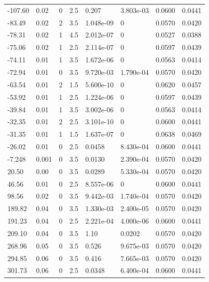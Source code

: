 \documentclass[preview]{standalone}
\begin{document}
{{\begin{tabular}{L{1.2cm}C{1.2cm} C{0.3cm}C{0.5cm} C{1.4cm}C{1.4cm} C{1.4cm}C{1.4cm}}
  -107.60  &  0.02  & 0     & 2.5 &  0.207  & 3.803e-03  & 0.0600 &  0.0441   \\ 
  -83.49  &  0.02  & 2     & 3.5 &  1.048e-09  & 0  & 0.0570 &  0.0420   \\ 
  -78.31  &  0.02  & 1     & 4.5 &  2.012e-07  & 0  & 0.0527 &  0.0388   \\ 
  -75.06  &  0.02  & 1     & 2.5 &  2.114e-07  & 0  & 0.0597 &  0.0439   \\ 
  -74.11  &  0.01  & 1     & 3.5 &  1.672e-06  & 0  & 0.0563 &  0.0414   \\ 
  -72.94  &  0.01  & 0     & 3.5 &  9.720e-03  & 1.790e-04  & 0.0570 &  0.0420   \\ 
  -63.54  &  0.01  & 2     & 1.5 &  5.600e-10  & 0  & 0.0620 &  0.0457   \\ 
  -53.92  &  0.01  & 1     & 2.5 &  1.224e-06  & 0  & 0.0597 &  0.0439   \\ 
  -39.84  &  0.01  & 1     & 3.5 &  3.002e-06  & 0  & 0.0563 &  0.0414   \\ 
  -32.35  &  0.01  & 2     & 2.5 &  3.101e-10  & 0  & 0.0600 &  0.0441   \\ 
  -31.35  &  0.01  & 1     & 1.5 &  1.637e-07  & 0  & 0.0638 &  0.0469   \\ 
  -26.02  &  0.01  & 0     & 2.5 &  0.0458  & 8.430e-04  & 0.0600 &  0.0441   \\ 
  -7.248  &  0.001  & 0     & 3.5 &  0.0130  & 2.390e-04  & 0.0570 &  0.0420   \\ 
  20.50  &  0.00  & 0     & 3.5 &  0.0289  & 5.330e-04  & 0.0570 &  0.0420   \\ 
  46.56  &  0.01  & 0     & 2.5 &  8.557e-06  & 0  & 0.0600 &  0.0441   \\ 
  98.56  &  0.02  & 0     & 3.5 &  9.442e-03  & 1.740e-04  & 0.0570 &  0.0420   \\ 
  189.82  &  0.04  & 0     & 3.5 &  1.330e-03  & 2.400e-05  & 0.0570 &  0.0420   \\ 
  191.23  &  0.04  & 0     & 2.5 &  2.221e-04  & 4.000e-06  & 0.0600 &  0.0441   \\ 
  209.10  &  0.04  & 0     & 3.5 &  1.10  & 0.0202  & 0.0570 &  0.0420   \\ 
  268.96  &  0.05  & 0     & 3.5 &  0.526  & 9.675e-03  & 0.0570 &  0.0420   \\ 
  294.85  &  0.06  & 0     & 3.5 &  0.416  & 7.665e-03  & 0.0570 &  0.0420   \\ 
  301.73  &  0.06  & 0     & 2.5 &  0.0348  & 6.400e-04  & 0.0600 &  0.0441   \\ 

\end{tabular}}}
\end{document}
